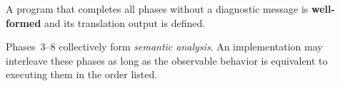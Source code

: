 \pnum
A program that completes all phases without a diagnostic message is
\textbf{well-formed} and its translation output is defined.

\begin{note}
  Phases~3--8 collectively form \emph{semantic analysis}.  An
  implementation may interleave these phases as long as the observable
  behavior is equivalent to executing them in the order listed.
\end{note}
